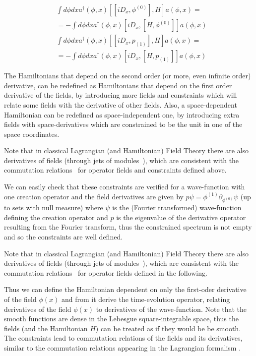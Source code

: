 \documentclass[11pt]{book}
\begin{document}
\begin{equation}\begin{aligned}
    &\int d\phi dx a^\dagger(\phi,x)[[iD_x,\phi^{(0)}],H]a(\phi,x)=\\
&=-\int d\phi dx a^\dagger(\phi,x)[iD_x,[H,\phi^{(0)}]]a(\phi,x)\\
    &\int d\phi dx a^\dagger(\phi,x)[[iD_x,p_{(1)}],H]a(\phi,x)=\\
&=-\int d\phi dx
    a^\dagger(\phi,x)[iD_x,[H,p_{(1)}]]a(\phi,x)  \end{aligned}\end{equation}

The Hamiltonians that depend on the second order (or more, even infinite
order) derivative, can be redefined as Hamiltonians that depend on the
first order derivative of the fields, by introducing more fields and
constraints which will relate some fields with the derivative of other
fields. Also, a space-dependent Hamiltonian can be redefined as
space-independent one, by introducing extra fields with
space-derivatives which are constrained to be the unit in one of the
space coordinates.

Note that in classical Lagrangian (and Hamiltonian) Field Theory there
are also derivatives of fields (through jets of
modules~\cite{Sardanashvily2008Mathematical}), which are consistent with the commutation
relations~\cite{Transtrum2005Commutation} for operator fields and constraints defined above.

We can easily check that these constraints are verified for a
wave-function with one creation operator and the field derivatives are
given by \(p \psi=\phi^{(1)}\partial_{\phi^{(0)}}\psi\) (up to sets with
null measure) where \(\psi\) is the (Fourier transformed) wave-function
defining the creation operator and \(p\) is the eigenvalue of the
derivative operator resulting from the Fourier transform, thus the
constrained spectrum is not empty and so the constraints are well
defined.

Note that in classical Lagrangian (and Hamiltonian) Field Theory there
are also derivatives of fields (through jets of
modules~\cite{Sardanashvily2008Mathematical}\cite{Transtrum2005Commutation}), which are consistent with the commutation
relations~\cite{Transtrum2005Commutation} for operator fields defined in the following.

Thus we can define the Hamiltonian dependent on only the first-oder
derivative of the field \(\phi(x)\) and from it derive the
time-evolution operator, relating derivatives of the field \(\phi(x)\)
to derivatives of the wave-function. Note that the smooth functions are
dense in the Lebesgue square-integrable space, thus the fields (and the
Hamiltonian \(H\)) can be treated as if they would be be smooth. The
constraints lead to commutation relations of the fields and its
derivatives, similar to the commutation relations appearing in the
Lagrangian formalism \cite{nbicq6aj03h}.
\end{document}
